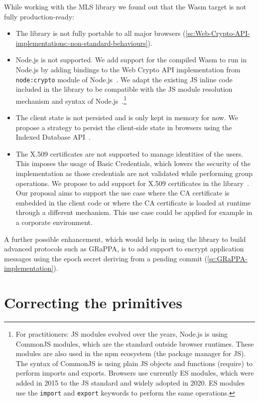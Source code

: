 While working with the MLS library we found out that the Wasm target
is not fully production-ready:
\begin{itemize}
    \item The library is not fully portable to all major browsers (\cref{sc:Web-Crypto-API-implementations:-non-standard-behaviours}).
    \item Node.js is not supported. We add support for the compiled Wasm to run in Node.js by adding bindings to the Web Crypto API implementation from \texttt{node:crypto} module of Node.js~\cite{NodeJsWebCryptoAPI}. We adapt the existing JS inline code included in the library to be compatible with the JS module resolution mechanism and syntax of Node.js~\cite{AWSNodeJSCodeContributions}.\footnote{For practitioners: JS modules evolved over the years, Node.js is using CommonJS modules, which are the standard outside browser runtimes. These modules are also used in the npm ecosystem (the package manager for JS). The syntax of CommonJS is using plain JS objects and functions (require) to perform imports and exports. Browsers use currently ES modules, which were added in 2015 to the JS standard and widely adopted in 2020. ES modules use the \texttt{import} and \texttt{export} keywords to perform the same operations.}
    \item The client state is not persisted and is only kept in memory for now. We propose a strategy to persist the client-side state in browsers using the Indexed Database API~\cite{MlsRsWebStorageProvider, IndexedDBAPI}.
    \item The X.509 certificates are not supported to manage identities of the users. This imposes the usage of Basic Credentials, which lowers the security of the implementation as those credentials are not validated while performing group operations. We propose to add support for X.509 certificates in the library~\cite{MlsRsX509Certificates}. Our proposal aims to support the use case where the CA certificate is embedded in the client code or where the CA certificate is loaded at runtime through a different mechanism. This use case could be applied for example in a corporate environment.
\end{itemize}

A further possible enhancement, which would help in
using the library to build advanced protocols such as GRaPPA,
is to add support to encrypt application messages
using the epoch secret deriving from a pending commit (\cref{sc:GRaPPA-implementation}).

\section{Correcting the primitives}\label{sc:correcting-primitives}


